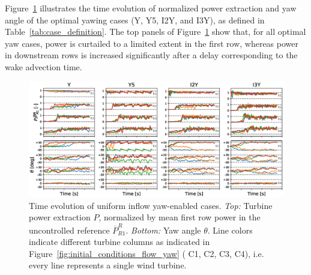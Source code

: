	Figure~\ref{fig:dynamic_uniform} illustrates the time evolution of normalized power extraction and yaw angle of the optimal yawing cases (Y, Y5, I2Y, and I3Y), as defined in Table~\ref{tab:case_definition}. 
	The top panels of Figure~\ref{fig:dynamic_uniform} show that, for all optimal yaw cases, power is curtailed to a limited extent in the first row, whereas power in downstream rows is increased significantly after a delay corresponding to the wake advection time.  
	\begin{figure}
		\includegraphics[width=\textwidth]{chapters/optimal_yaw_control/power_yaw_lam.eps}	
		\caption[Time evolution of uniform inflow yaw-enabled cases.]{Time evolution of uniform inflow yaw-enabled cases. \emph{Top: } Turbine power extraction $P$, normalized by mean first row power in the uncontrolled reference $\overline{P}_{R1}^R$. \emph{Bottom: } Yaw angle $\theta$. Line colors indicate different turbine columns as indicated in Figure~\ref{fig:initial_conditions_flow_yaw} ({\color{C1} C1}, {\color{C2} C2}, {\color{C3} C3}, {\color{C4} C4}), i.e. every line represents a single wind turbine. \label{fig:dynamic_uniform}}
	\end{figure}
	
